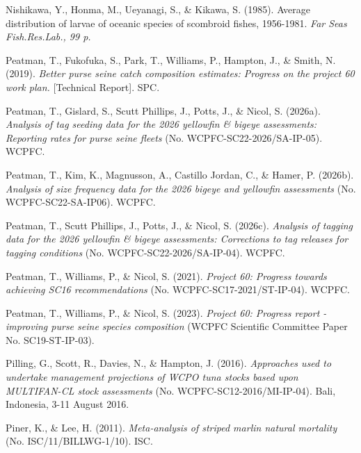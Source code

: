 \documentclass[
  english,
  a4paper,
  a4paper,
  11pt]{SCreport}
\newlength{\cslhangindent}
\newenvironment{CSLReferences}[2] %
 {\begin{list}{}{%
  \setlength{\itemindent}{0pt}
  \setlength{\leftmargin}{0pt}
  \setlength{\parsep}{0pt}
  \ifodd #1
   \setlength{\leftmargin}{\cslhangindent}
   \setlength{\itemindent}{-1\cslhangindent}
  \fi
  \setlength{\itemsep}{#2\baselineskip}}}
 {\end{list}}
\begin{document}
\begin{CSLReferences}{1}{0}
Nishikawa, Y., Honma, M., Ueyanagi, S., \& Kikawa, S. (1985). Average
distribution of larvae of oceanic species of scombroid fishes,
1956-1981. \emph{Far Seas Fish.Res.Lab., 99 p.}

Peatman, T., Fukofuka, S., Park, T., Williams, P., Hampton, J., \&
Smith, N. (2019). \emph{Better purse seine catch composition estimates:
Progress on the project 60 work plan.} {[}Technical Report{]}. SPC.

Peatman, T., Gislard, S., Scutt Phillips, J., Potts, J., \& Nicol, S.
(2026a). \emph{Analysis of tag seeding data for the 2026 yellowfin \&
bigeye assessments: Reporting rates for purse seine fleets} (No.
{WCPFC}-{SC}22-2026/{SA}-{IP}-05). WCPFC.

Peatman, T., Kim, K., Magnusson, A., Castillo Jordan, C., \& Hamer, P.
(2026b). \emph{Analysis of size frequency data for the 2026 bigeye and
yellowfin assessments} (No. {WCPFC}-{SC}22-{SA}-{IP}06). WCPFC.

Peatman, T., Scutt Phillips, J., Potts, J., \& Nicol, S. (2026c).
\emph{Analysis of tagging data for the 2026 yellowfin \& bigeye
assessments: Corrections to tag releases for tagging conditions} (No.
{WCPFC}-{SC}22-2026/{SA}-{IP}-04). WCPFC.

Peatman, T., Williams, P., \& Nicol, S. (2021). \emph{Project 60:
Progress towards achieving {SC}16 recommendations} (No.
{WCPFC}-{SC}17-2021/{ST}-{IP}-04). WCPFC.

Peatman, T., Williams, P., \& Nicol, S. (2023). \emph{Project 60:
{Progress} report - improving purse seine species composition} (WCPFC
Scientific Committee Paper No. SC19-ST-IP-03).

Pilling, G., Scott, R., Davies, N., \& Hampton, J. (2016).
\emph{Approaches used to undertake management projections of {WCPO} tuna
stocks based upon {MULTIFAN}-{CL} stock assessments} (No.
{WCPFC}-{SC}12-2016/{MI}-{IP}-04). Bali, Indonesia, 3-11 August 2016.

Piner, K., \& Lee, H. (2011). \emph{Meta-analysis of striped marlin
natural mortality} (No. {ISC}/11/{BILLWG}‐1/10). ISC.


\end{CSLReferences}
\end{document}
